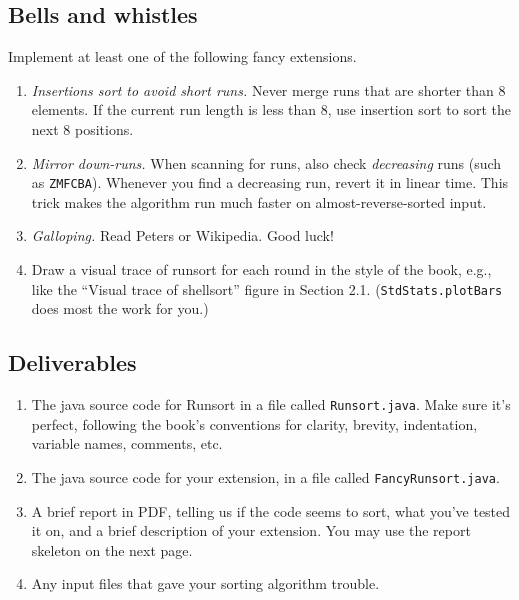 \documentclass{tufte-handout}
\begin{document}
\subsection{Bells and whistles}
Implement at least one of the following fancy extensions.
\begin{enumerate}
\item \emph{Insertions sort to avoid short runs.}
  Never merge runs that are shorter than 8 elements.
  If the current run length is less than 8,
  use insertion sort to sort the next 8 positions.
\item \emph{Mirror down-runs.}
  When scanning for runs, also check \emph{decreasing} runs (such as \texttt{ZMFCBA}).
  Whenever you find a decreasing run, revert it in linear time.
  This trick makes the algorithm run much faster on almost-reverse-sorted input.
\item \emph{Galloping.} Read Peters or Wikipedia. Good luck!
\item Draw a visual trace of runsort for each round in the style of the book, e.g., like the ``Visual trace of shellsort'' figure in Section 2.1.
  (\texttt{StdStats.plotBars} does most the work for you.)
\end{enumerate}

\subsection{Deliverables}

\begin{enumerate}
  \item The java source code for Runsort in a file called {\tt Runsort.java}.
      Make sure it's perfect, following the book's conventions for clarity, brevity, indentation, variable names, comments, etc.
  \item The java source code for your extension, in a file called {\tt FancyRunsort.java}.
  \item A brief report in PDF, telling us if the code seems to sort, what you've tested it on, and a brief description of your extension.
  You may use the report skeleton on the next page.
  \item Any input files that gave your sorting algorithm trouble.
\end{enumerate}
\end{document}
